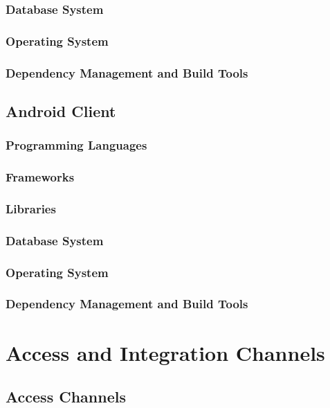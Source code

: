 \documentclass[11pt,fleqn]{book} %
\begin{document}
	\subsection{Database System}
	\subsection{Operating System}
	\subsection{Dependency Management and Build Tools}
	\section{Android Client}
	\subsection{Programming Languages}
	\subsection{Frameworks}
	\subsection{Libraries}
	\subsection{Database System}
	\subsection{Operating System}
	\subsection{Dependency Management and Build Tools}	
	
	
	
	
	\chapter{Access and Integration Channels}
	
	\section{Access Channels}
	
\end{document}
